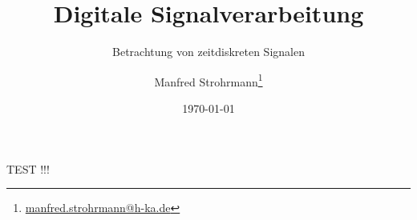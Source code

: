 \documentclass[
    paper=a4,
    parskip=half,          %
    fontsize=11pt,
    DIV=14,                %
    headsepline=true,      %
    twoside=semi,          %
    BCOR=0em,              %
    headinclude=true,      %
    toc=index,
    toc=listof,
    toc=bibliography,
    numbers=noendperiod,   %
    open=any,              %
    fleqn,                 %
]{book}
\title{Digitale Signalverarbeitung}
\subtitle{Betrachtung von zeitdiskreten Signalen}
\author{
    Manfred Strohrmann\thanks{
        \href{mailto:manfred.strohrmann@h-ka.de}{manfred.strohrmann@h-ka.de}
    }
}
\date{\today}
\begin{document}







TEST !!!

% 
% 
% 
% 
% 
% 
% 
% 
% 
% 
% 
% 
% 
% 





\end{document}
